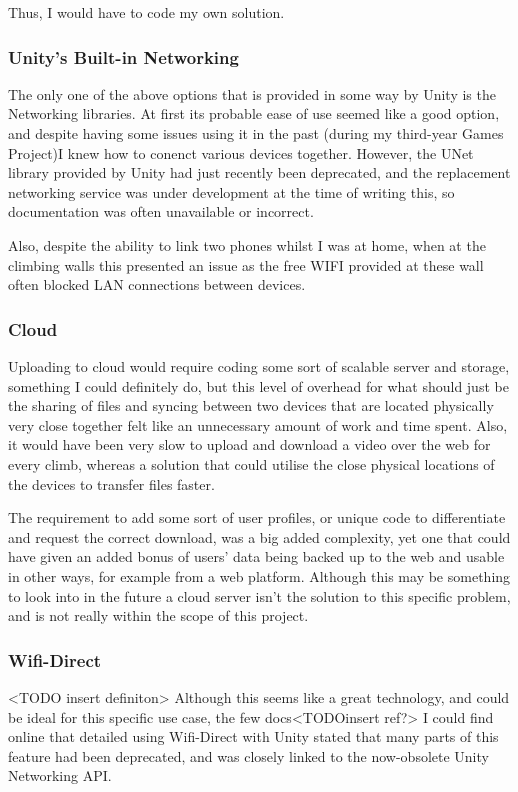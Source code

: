 Thus, I would have to code my own solution.


\subsubsection{Unity's Built-in Networking}
The only one of the above options that is provided in some way by Unity is the Networking libraries.
At first its probable ease of use seemed like a good option, and despite having some issues using it in the past (during my third-year Games Project)I knew how to conenct various devices together.
However, the UNet library provided by Unity had just recently been deprecated, and the replacement networking service was under development at the time of writing this, so documentation was often unavailable or incorrect.

Also, despite the ability to link two phones whilst I was at home, when at the climbing walls this presented an issue as the free WIFI provided at these wall often blocked LAN connections between devices.

\subsubsection{Cloud}
Uploading to cloud would require coding some sort of scalable server and storage, something I could definitely do, but this level of overhead for what should just be the sharing of files and syncing between two devices that are located physically very close together felt like an unnecessary amount of work and time spent.
Also, it would have been very slow to upload and download a video over the web for every climb, whereas a solution that could utilise the close physical locations of the devices to transfer files faster.

The requirement to add some sort of user profiles, or unique code to differentiate and request the correct download, was a big added complexity, yet one that could have given an added bonus of users' data being backed up to the web and usable in other ways, for example from a web platform.
Although this may be something to look into in the future a cloud server isn't the solution to this specific problem, and is not really within the scope of this project.

\subsubsection{Wifi-Direct}
<TODO insert definiton>
Although this seems like a great technology, and could be ideal for this specific use case, the few docs<TODOinsert ref?> I could find online that detailed using Wifi-Direct with Unity stated that many parts of this feature had been deprecated, and was closely linked to the now-obsolete Unity Networking API.


